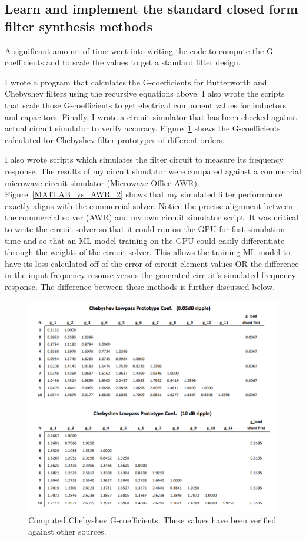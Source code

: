 \documentclass[10pt,conference]{IEEEtran}
\begin{document}
\subsection{Learn and implement the standard closed form filter synthesis methods}


A significant amount of time went into writing the code to compute the G-coefficients and to scale the values to get a standard filter design. 

I wrote a program that calculates the G-coefficients for Butterworth and Chebyshev filters using the recursive equations above. I also wrote the scripts that scale those G-coefficients to get electrical component values for inductors and capacitors. Finally, I wrote a circuit simulator that has been checked against actual circuit simulator to verify accuracy. Figure~\ref{Chebyshev_G_coefs} shows the G-coefficients calculated for Chebyshev filter prototypes of different orders.


I also wrote scripts which simulates the filter circuit to measure its frequency response. The results of my circuit simulator were compared against a commercial microwave circuit simulator (Microwave Office AWR). Figure~\ref{MATLAB_vs_AWR_2} shows that my simulated filter performance exactly aligns with the commercial solver. Notice the precise alignment between the commercial solver (AWR) and my own circuit simulator script. It was critical to write the circuit solver so that it could run on the GPU for fast simulation time and so that an ML model training on the GPU could easily differentiate through the weights of the circuit solver. This allows the training ML model to have its loss calculated off of the error of circuit element values OR the difference in the input frequency resonse versus the generated circuit's simulated frequency response. The difference between these methods is further discussed below.




\begin{figure}
	\centering
	\includegraphics[width=0.9\linewidth]{Figures/Chebyshev_G_coefs.png}
	\caption{Computed Chebyshev G-coefficients. These values have been verified against other sources.}
	\label{Chebyshev_G_coefs}
\end{figure}
\end{document}
